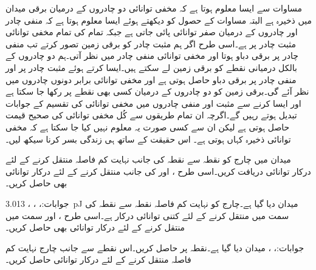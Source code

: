 مساوات  سے ایسا معلوم ہوتا ہے کہ مخفی توانائی دو چادروں کے درمیان برقی میدان میں ذخیرہ ہے البتہ مساوات  کے حصول کو دیکھتے ہوئے  ایسا معلوم ہوتا ہے کہ منفی چادر اور چادروں کے درمیان صفر توانائی پائی جاتی ہے جبکہ تمام کی تمام مخفی توانائی مثبت چادر پر ہے۔اسی طرح اگر ہم مثبت چادر کو برقی زمین تصور کرتے تب منفی چادر پر برقی دباو  ہوتا اور مخفی توانائی منفی چادر میں نظر آتی۔ہم دو چادروں کے بالکل درمیانی نقطے کو برقی زمین لے سکتے ہیں۔ایسا کرتے ہوئے مثبت چادر پر  اور منفی چادر پر  برقی دباو حاصل ہوتی ہے اور مخفی توانائی برابر دونوں چادروں میں نظر آئے گی۔برقی زمین کو دو چادروں کے درمیان کسی بھی نقطے پر رکھا جا سکتا ہے اور ایسا کرنے سے مثبت اور منفی چادروں میں مخفی توانائی کی تقسیم کے  جوابات تبدیل ہوتے رہیں گے۔اگرچہ ان تمام طریقوں سے کُل مخفی توانائی کی صحیح قیمت حاصل ہوتی ہے لیکن ان سے کسی صورت یہ معلوم نہیں کیا جا سکتا ہے کہ مخفی توانائی ذخیرہ کہاں ہوتی ہے۔ اس حقیقت کے ساتھ ہی زندگی بسر کرنا سیکھ لیں۔ 


\newpage
{}

میدان  میں  چارج کو نقطہ  سے
 نقطہ  کی جانب نہایت کم فاصلہ  منتقل کرنے کے لئے درکار توانائی دریافت کریں۔اسی طرح ،  اور  کی جانب منتقل کرنے کے لئے درکار توانائی بھی حاصل کریں۔

جوابات:، ، ، {\SI{3.013}{\pico\joule}}
میدان  دیا گیا ہے۔چارج  کو نہایت کم فاصلہ  نقطہ  سے نقطہ  کی سمت میں منتقل کرنے کے لئے کتنی توانائی درکار ہے۔اسی طرح ،  اور  سمت میں منتقل کرنے کے لئے درکار توانائی بھی حاصل کریں۔

جوابات:، ، 
میدان  دیا گیا ہے۔نقطہ  پر  حاصل کریں۔اس نقطے سے  جانب  چارج نہایت کم فاصلہ  منتقل کرنے کے لئے درکار توانائی حاصل کریں۔
 

